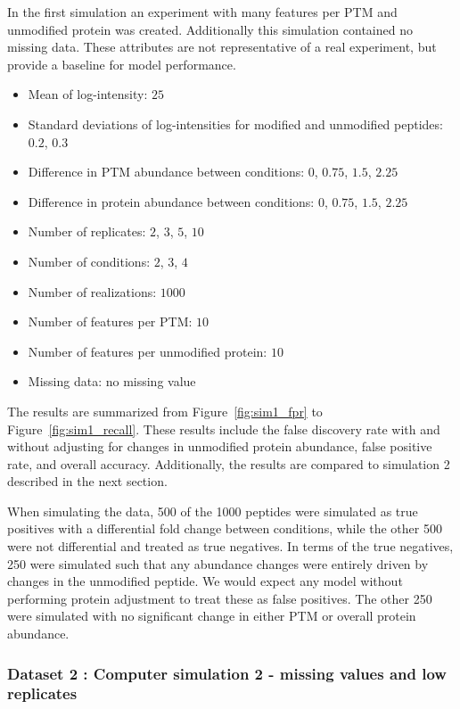 \documentclass{mcp}
\def\sfigref#1{{Figure~\ref{#1}}}
\begin{document}
In the first simulation an experiment with many features per PTM and unmodified protein was created. Additionally this simulation contained no missing data. These attributes are not representative of a real experiment, but provide a baseline for model performance.

\begin{itemize}
\item Mean of log-intensity: $25$
\item Standard deviations of log-intensities for modified and unmodified peptides: $0.2$, $0.3$
\item Difference in PTM abundance between conditions: $0$, $0.75$, $1.5$, $2.25$
\item Difference in protein abundance between conditions: $0$, $0.75$, $1.5$, $2.25$
\item Number of replicates: $2$, $3$, $5$, $10$
\item Number of conditions: $2$, $3$, $4$
\item Number of realizations: $1000$
\item Number of features per PTM: $10$
\item Number of features per unmodified protein: $10$
\item Missing data: no missing value
\end{itemize}

The results are summarized from \sfigref{fig:sim1_fpr} to \sfigref{fig:sim1_recall}. These results include the false discovery rate with and without adjusting for changes in unmodified protein abundance, false positive rate, and overall accuracy. Additionally, the results are compared to simulation 2 described in the next section.

When simulating the data, 500 of the 1000 peptides were simulated as true positives with a differential fold change between conditions, while the other 500 were not differential and treated as true negatives. In terms of the true negatives, 250 were simulated such that any abundance changes were entirely driven by changes in the unmodified peptide. We would expect any model without performing protein adjustment to treat these as false positives. The other 250 were simulated with no significant change in either PTM or overall protein abundance.

\subsubsection{Dataset 2 : Computer simulation 2 - missing values and low replicates}
\end{document}
